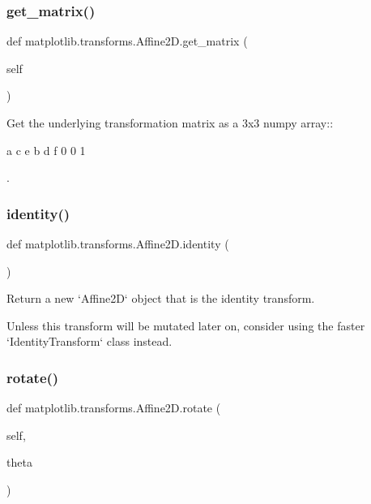 \subsubsection{\texorpdfstring{get\+\_\+matrix()}{get\_matrix()}}
{\footnotesize\ttfamily def matplotlib.\+transforms.\+Affine2\+D.\+get\+\_\+matrix (\begin{DoxyParamCaption}\item[{}]{self }\end{DoxyParamCaption})}

\begin{DoxyVerb}Get the underlying transformation matrix as a 3x3 numpy array::

  a c e
  b d f
  0 0 1

.
\end{DoxyVerb}
 \mbox{\label{classmatplotlib_1_1transforms_1_1Affine2D_a648aabbd99acf62a85afde8f47d0e4b3}} 
\subsubsection{\texorpdfstring{identity()}{identity()}}
{\footnotesize\ttfamily def matplotlib.\+transforms.\+Affine2\+D.\+identity (\begin{DoxyParamCaption}{ }\end{DoxyParamCaption})\hspace{0.3cm}{\ttfamily [static]}}

\begin{DoxyVerb}Return a new `Affine2D` object that is the identity transform.

Unless this transform will be mutated later on, consider using
the faster `IdentityTransform` class instead.
\end{DoxyVerb}
 \mbox{\label{classmatplotlib_1_1transforms_1_1Affine2D_a93c783041609d16fa21604d34824d498}} 
\subsubsection{\texorpdfstring{rotate()}{rotate()}}
{\footnotesize\ttfamily def matplotlib.\+transforms.\+Affine2\+D.\+rotate (\begin{DoxyParamCaption}\item[{}]{self,  }\item[{}]{theta }\end{DoxyParamCaption})}


